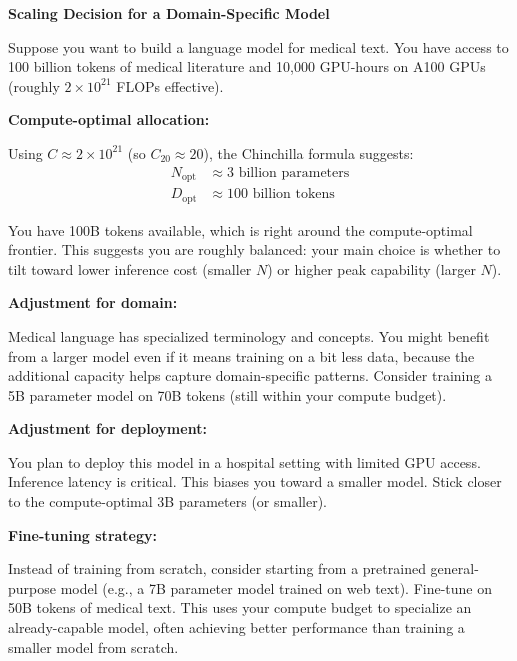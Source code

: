 \begin{examplebox}
\textbf{Scaling Decision for a Domain-Specific Model}

\vspace{0.5em}

Suppose you want to build a language model for medical text. You have access to 100 billion tokens of medical literature and 10,000 GPU-hours on A100 GPUs (roughly $2 \times 10^{21}$ FLOPs effective).

\vspace{0.5em}

\textbf{Compute-optimal allocation:}

Using $C \approx 2 \times 10^{21}$ (so $C_{20} \approx 20$), the Chinchilla formula suggests:
\begin{align}
N_{\text{opt}} &\approx 3 \text{ billion parameters} \\
D_{\text{opt}} &\approx 100 \text{ billion tokens}
\end{align}

You have 100B tokens available, which is right around the compute-optimal frontier. This suggests you are roughly balanced: your main choice is whether to tilt toward lower inference cost (smaller $N$) or higher peak capability (larger $N$).

\vspace{0.5em}

\textbf{Adjustment for domain:}

Medical language has specialized terminology and concepts. You might benefit from a larger model even if it means training on a bit less data, because the additional capacity helps capture domain-specific patterns. Consider training a 5B parameter model on 70B tokens (still within your compute budget).

\vspace{0.5em}

\textbf{Adjustment for deployment:}

You plan to deploy this model in a hospital setting with limited GPU access. Inference latency is critical. This biases you toward a smaller model. Stick closer to the compute-optimal 3B parameters (or smaller).

\vspace{0.5em}

\textbf{Fine-tuning strategy:}

Instead of training from scratch, consider starting from a pretrained general-purpose model (e.g., a 7B parameter model trained on web text). Fine-tune on 50B tokens of medical text. This uses your compute budget to specialize an already-capable model, often achieving better performance than training a smaller model from scratch.


\end{examplebox}
